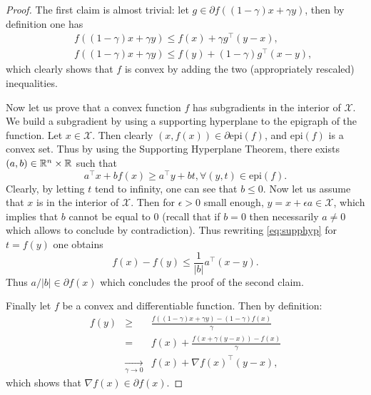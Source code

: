 \begin{proof}
The first claim is almost trivial: let $g \in \partial f((1-\gamma) x + \gamma y)$, then by definition one has
\begin{eqnarray*}
& & f((1-\gamma) x + \gamma y) \leq f(x) + \gamma g^{\top} (y - x) , \\
& & f((1-\gamma) x + \gamma y) \leq f(y) + (1-\gamma) g^{\top} (x - y) ,
\end{eqnarray*}
which clearly shows that $f$ is convex by adding the two (appropriately rescaled) inequalities.
\newline

Now let us prove that a convex function $f$ has subgradients in the interior of $\mathcal{X}$. We build a subgradient by using a supporting hyperplane to the epigraph of the function. Let $x \in \mathcal{X}$. Then clearly $(x,f(x)) \in \partial \mathrm{epi}(f)$, and $\mathrm{epi}(f)$ is a convex set. Thus by using the Supporting Hyperplane Theorem, there exists $(a,b) \in \mathbb{R}^n \times \mathbb{R}$ such that
\begin{equation} \label{eq:supphyp}
a^{\top} x + b f(x) \geq a^{\top} y + b t, \forall (y,t) \in \mathrm{epi}(f) .
\end{equation}
Clearly, by letting $t$ tend to infinity, one can see that $b \leq 0$. Now let us assume that $x$ is in the interior of $\mathcal{X}$. Then for $\epsilon > 0$ small enough, $y=x + \epsilon a \in \mathcal{X}$, which implies that $b$ cannot be equal to $0$ (recall that if $b=0$ then necessarily $a \neq 0$ which allows to conclude by contradiction). Thus rewriting \eqref{eq:supphyp} for $t=f(y)$ one obtains
$$f(x) - f(y) \leq \frac{1}{|b|} a^{\top} (x - y) .$$
Thus $a / |b| \in \partial f(x)$ which concludes the proof of the second claim.
\newline

Finally let $f$ be a convex and differentiable function. Then by definition:
\begin{eqnarray*}
f(y) & \geq & \frac{f((1-\gamma) x + \gamma y) - (1- \gamma) f(x)}{\gamma} \\
& = & f(x) + \frac{f(x + \gamma (y - x)) - f(x)}{\gamma} \\
& \underset{\gamma \to 0}{\to} & f(x) + \nabla f(x)^{\top} (y-x),
\end{eqnarray*}
which shows that $\nabla f(x) \in \partial f(x)$.
\end{proof}

